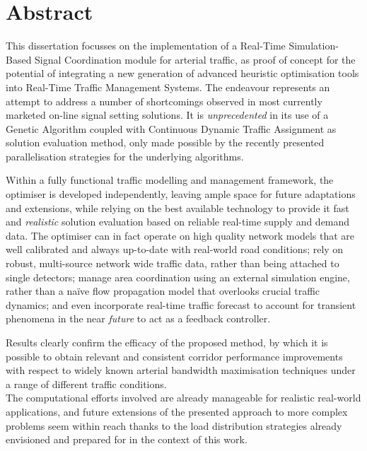 \chapter*{Abstract}
This dissertation focusses on the implementation of a Real-Time Simulation-Based Signal Coordination module for arterial traffic, as proof of concept for the potential of integrating a new generation of advanced heuristic optimisation tools into Real-Time Traffic Management Systems.
The endeavour represents an attempt to address a number of shortcomings observed in most currently marketed on-line signal setting solutions.
It is \emph{unprecedented} in its use of a Genetic Algorithm coupled with Continuous Dynamic Traffic Assignment as solution evaluation method, only made possible by the recently presented parallelisation strategies for the underlying algorithms.

Within a fully functional traffic modelling and management framework, the optimiser is developed independently, leaving ample space for future adaptations and extensions, while relying on the best available technology to provide it fast and \emph{realistic} solution evaluation based on reliable real-time supply and demand data.
The optimiser can in fact operate on high quality network models that are well calibrated and always up-to-date with real-world road conditions; rely on robust, multi-source network wide traffic data, rather than being attached to single detectors; manage area coordination using an external simulation engine, rather than a na\"ive flow propagation model that overlooks crucial traffic dynamics; and even incorporate real-time traffic forecast to account for transient phenomena in the near \emph{future} to act as a feedback controller.

Results clearly confirm the efficacy of the proposed method, by which it is possible to obtain relevant and consistent corridor performance improvements with respect to widely known arterial bandwidth maximisation techniques under a range of different traffic conditions. \\
The computational efforts involved are already manageable for realistic real-world applications, and future extensions of the presented approach to more complex problems seem within reach thanks to the load distribution strategies already envisioned and prepared for in the context of this work.